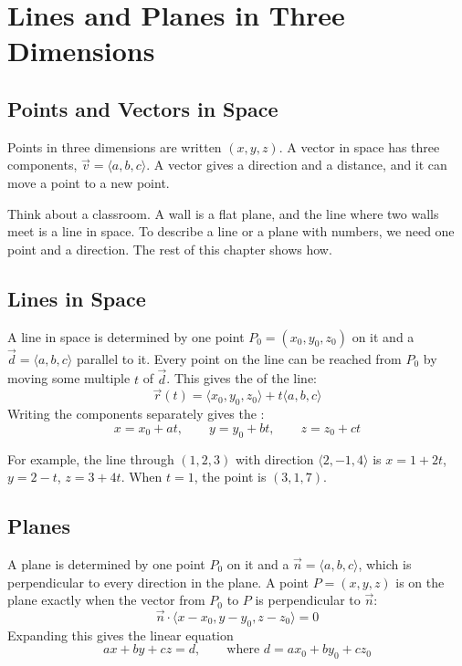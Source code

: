 \chapter{Lines and Planes in Three Dimensions}

\section{Points and Vectors in Space}
Points in three dimensions are written $(x, y, z)$. A vector in space has three
components, $\vec{v} = \langle a, b, c\rangle$. A vector gives a direction
and a distance, and it can move a point to a new point.

Think about a classroom. A wall is a flat plane, and the line where two walls meet is a line in space. To describe a line or a plane with numbers, we need one point and a direction. The rest of this chapter shows how.

\section{Lines in Space}
A line in space is determined by one point $P_0 = (x_0, y_0, z_0)$ on it and a
 $\vec{d} = \langle a, b, c\rangle$ parallel to it.
Every point on the line can be reached from $P_0$ by moving some multiple $t$ of
$\vec{d}$. This gives the 
of the line:
$$\vec{r}(t) = \langle x_0, y_0, z_0\rangle + t\langle a, b, c\rangle$$
Writing the components separately gives the :
$$x = x_0 + at, \qquad y = y_0 + bt, \qquad z = z_0 + ct$$

For example, the line through $(1, 2, 3)$ with direction $\langle 2, -1, 4\rangle$ is
$x = 1 + 2t$, $y = 2 - t$, $z = 3 + 4t$. When $t = 1$, the point is $(3, 1, 7)$.

\section{Planes}
A plane is determined by one point $P_0$ on it and a 
$\vec{n} = \langle a, b, c\rangle$, which is perpendicular to every direction in the
plane. A point $P = (x, y, z)$ is on the plane exactly when the vector from
$P_0$ to $P$ is perpendicular to $\vec{n}$:
$$\vec{n} \cdot \langle x - x_0, y - y_0, z - z_0\rangle = 0$$
Expanding this gives the linear equation
$$ax + by + cz = d, \qquad \text{where } d = ax_0 + by_0 + cz_0$$

